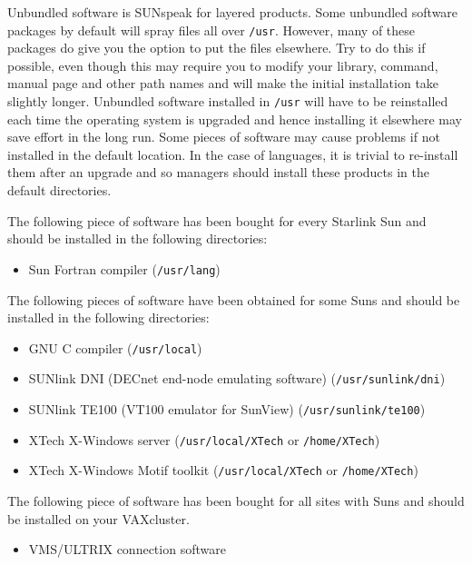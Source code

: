 Unbundled software is SUNspeak for layered products.
Some unbundled software packages by default will spray files all over
{\tt /usr}.
However, many of these packages do give you the option to put the files
elsewhere. Try to do this if possible, even though this may require you to
modify your library, command, manual page and other path names and will make
the initial installation take slightly longer. Unbundled software installed in
{\tt /usr} will have to be reinstalled each time the operating system is upgraded and
hence installing it elsewhere may save effort in the long run.
Some pieces of software may cause problems if not
installed in the default location. In the case of languages, it is trivial to
re-install them after an upgrade and so managers should install these products
in the default directories.

The following piece of software has been bought for every Starlink
Sun and should be installed in the following directories:

\begin{itemize}

\item	Sun Fortran compiler ({\tt /usr/lang})

\end{itemize}

The following pieces of software have been obtained for some Suns and should be
installed in the following directories:

\begin{itemize}

\item	GNU C compiler ({\tt /usr/local})
\item	SUNlink DNI (DECnet end-node emulating software) ({\tt /usr/sunlink/dni})
\item	SUNlink TE100  (VT100 emulator for SunView) ({\tt /usr/sunlink/te100})
\item	XTech   X-Windows server ({\tt /usr/local/XTech} or {\tt /home/XTech})
\item	XTech   X-Windows Motif toolkit ({\tt /usr/local/XTech} or {\tt /home/XTech})

\end{itemize}

The following piece of software has been bought for all sites with Suns and
should be installed on your VAXcluster.

\begin{itemize}

\item   VMS/ULTRIX connection software

\end{itemize}

